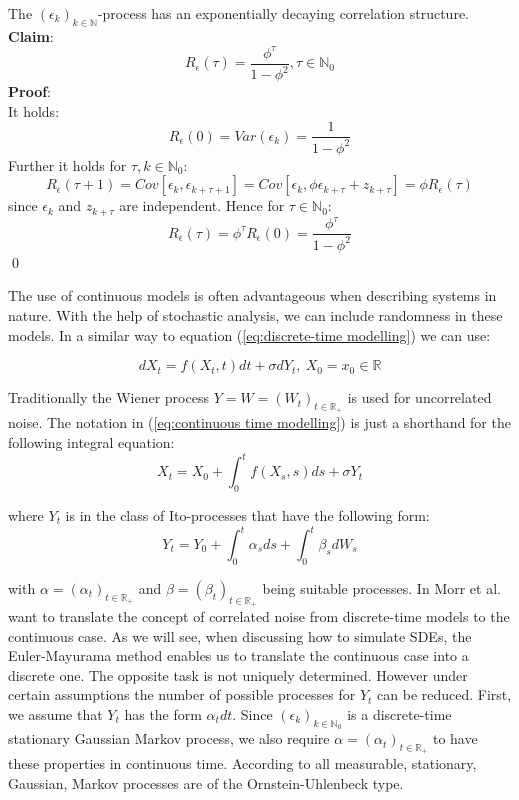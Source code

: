 \documentclass[%
thesis=student,%
coverpage=false,%
titlepage=false,%
headmarks=true, %
english,%
font=libertine, %
math=newpxtx, %
BCOR=5mm,%
coverBCOR=11mm%
]{tumbook}
\begin{document}
The $(\epsilon_{k})_{k \in \mathbb{N}}$-process has an exponentially decaying correlation structure. \textbf{Claim}:
\[
R_{\epsilon}(\tau) = \frac{\phi^{\tau}}{1-\phi^{2}}, \tau \in \mathbb{N}_{0}
\]
\textbf{Proof}: \\
It holds: 
\[
R_{\epsilon}(0)= Var(\epsilon_{k}) = \frac{1}{1-\phi^{2}}
\]
Further it holds for $\tau, k \in \mathbb{N}_{0}$:
\[
R_{\epsilon}(\tau+1) = Cov[\epsilon_{k},\epsilon_{k+\tau + 1}] = Cov[\epsilon_{k},\phi\epsilon_{k+\tau}+z_{k+\tau}] = \phi R_{\epsilon}(\tau)
\]
since $\epsilon_{k}$ and $z_{k+\tau}$ are independent. Hence for $\tau \in \mathbb{N}_{0}$:
\[
R_{\epsilon}(\tau) = \phi^{\tau}R_{\epsilon}(0)=\frac{\phi^{\tau}}{1-\phi^{2}}
\]
\qed

The use of continuous models is often advantageous when describing systems in nature. With the help of stochastic analysis, we can include randomness in these models. In a similar way to equation (\ref{eq:discrete-time modelling}) we can use: 

\begin{equation}
    dX_{t} = f(X_{t},t)dt + \sigma dY_{t}, \ X_{0} = x_{0} \in \mathbb{R}
    \label{eq:continuous time modelling}
\end{equation}

Traditionally the Wiener process $Y = W = (W_{t})_{t\in \mathbb{R}_{+}}$ is used for uncorrelated noise. The notation in (\ref{eq:continuous time modelling}) is just a shorthand for the following integral equation:
\[
X_{t} = X_{0} + \int_{0}^{t}f(X_{s},s)ds + \sigma Y_{t}
\]

where $Y_{t}$ is in the class of Ito-processes that have the following form:
\begin{equation}
    Y_{t} = Y_{0} + \int_{0}^{t}\alpha_{s}ds + \int_{0}^{t}\beta_{s}dW_{s}
    \label{eq:Ito process}
\end{equation}

with $\alpha = (\alpha_{t})_{t\in\mathbb{R}_{+}}$ and $\beta = (\beta_{t})_{t\in\mathbb{R}_{+}}$ being suitable processes.
In \cite{Morr:2022} Morr et al. want to translate the concept of correlated noise from discrete-time models to the continuous case. As we will see, when discussing how to simulate SDEs, the Euler-Mayurama method enables us to translate the continuous case into a discrete one. The opposite task is not uniquely determined. However under certain assumptions the number of possible processes for $Y_{t}$ can be reduced. First, we assume that $Y_{t}$ has the form $\alpha_{t}dt$. Since $(\epsilon_{k})_{k\in\mathbb{N}_{0}}$ is a discrete-time stationary Gaussian Markov process, we also require $\alpha = (\alpha_{t})_{t\in\mathbb{R}_{+}}$ to have these properties in continuous time. According to \cite{doob:1942} all measurable, stationary, Gaussian, Markov processes are of the Ornstein-Uhlenbeck type. 
\end{document}
